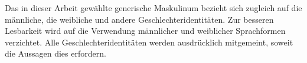 

Das in dieser Arbeit gewählte generische Maskulinum bezieht sich zugleich auf die
männliche, die weibliche und andere Geschlechteridentitäten. Zur besseren Lesbarkeit
wird auf die Verwendung männlicher und weiblicher Sprachformen verzichtet. Alle
Geschlechteridentitäten werden ausdrücklich mitgemeint, soweit die Aussagen dies
erfordern.